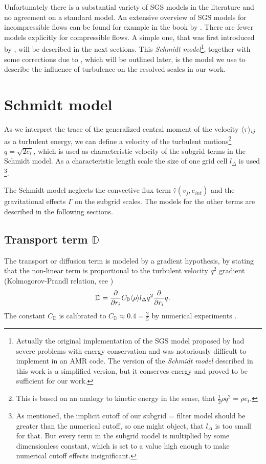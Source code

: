 Unfortunately there is a substantial variety of SGS models in the literature
and no agreement on a standard model. An extensive overview of SGS models for
incompressible flows can be found for example in the book by \citet{Sagaut2006}.
There are fewer models explicitly for compressible flows. A simple one,
that was first introduced by \citet{Schmidt2004,Schmidt2006a}, will
be described in the next sections. This \emph{Schmidt model}\footnote{Actually
the original implementation of the SGS model proposed by \citet{Schmidt2006a}
had severe problems with energy conservation and was notoriously difficult to
implement in an AMR code. The version of the \emph{Schmidt model} described in
this work is a simplified version, but it conserves energy and proved to be
sufficient for our work.}, together with some
corrections due to \citet{Sarkar1992}, which will be outlined later, is the
model we use to describe the influence of turbulence on the resolved scales
in our work.

\section{Schmidt model} 
As we interpret the trace of the generalized central moment of the
velocity $\langle \tau \rangle_{ij}$ as a turbulent energy, we can define a
velocity of the turbulent motions\footnote{This is 
based on an analogy to kinetic energy in the sense, that 
$\frac{1}{2}\rho q^2 = \rho e_t$.} $q=\sqrt{2 e_t}$, which is used as
characteristic velocity of the subgrid terms in the Schmidt model. As a
characteristic length scale the size of one grid cell $l_{\Delta}$ is used
\footnote{As mentioned, the implicit cutoff of our subgrid = filter model
should be greater than the numerical cutoff, so one might object, that 
$l_{\Delta}$ is too small for that. But every term in the subgrid model is
multiplied by some dimensionless constant, which is set to a value high enough
to make numerical cutoff effects insignificant.}.

The Schmidt model neglects the convective flux term
$\hat{\tau}(v_j,e_{int})$ and the gravitational effects $\Gamma$ on the subgrid
scales. The models for the other terms are described in the following sections.

\subsection{Transport term \texorpdfstring{$\mathbb{D}$}{D}}
The transport or diffusion term is modeled by a gradient hypothesis, by stating
that the non-linear term is proportional to the turbulent velocity $q^2$
gradient (Kolmogorov-Prandl relation, see \citet[p.97]{Sagaut2006})
\begin{align}
\mathbb{D}=\frac{\partial}{\partial r_i}C_{\mathbb{D}}\langle \rho \rangle l_{\Delta} q^2 \frac{\partial}{\partial r_i} q.
\end{align}
The constant $C_{\mathbb{D}}$ is
calibrated to $C_{\mathbb{D}} \approx 0.4 = \frac{2}{5}$ by
numerical experiments \citep{Schmidt2006}.

